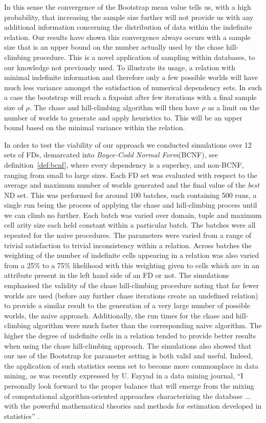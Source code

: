 In this sense the convergence of the Bootstrap mean value
tells us, with a high probability, that
increasing the sample size further will not provide us with any
additional information concerning the distribution of data within the
indefinite relation. Our 
results have shown this convergence always occurs with a sample size 
that is an upper bound on the 
number actually used by the chase hill-climbing procedure. This is a novel
application of sampling within databases, to our knowledge not
previously used. To illustrate its usage, a relation with 
minimal indefinite information and therefore only
a few possible worlds will have much less variance amongst the satisfaction
of numerical dependency sets. In such a case the bootstrap will reach
a fixpoint after few iterations with a final sample size of $\rho$. The
chase and hill-climbing algorithm will then have $\rho$ as a limit on
the number of worlds to generate and apply heuristics to. This will be
an upper bound based on the minimal variance within the relation.

\smallskip

In order to test the viability of our approach we conducted simulations
over 12 sets of FDs, demarcated into {\em Boyce-Codd Normal
Form}(BCNF), see definition~\ref{def:bcnf}, where every dependency is
a superkey, 
and non-BCNF, ranging from small to large sizes. 
 Each FD set was evaluated with respect to the average and maximum number
of worlds generated and the final value of the {\em best} ND set.
This was performed for around 100 batches, each containing 500 runs, a
single run being the process of applying the 
chase and hill-climbing process until we can climb no further. 
Each batch was varied over domain, tuple
and maximum cell arity size each held constant within a
particular batch. The batches were all repeated for the naive procedures. The
parameters 
were varied from a range of trivial satisfaction to trivial inconsistency
within a relation. Across batches the weighting of the number of 
indefinite cells appearing in a relation was also varied from a 25\%
to a 75\% likelihood with this weighting given to cells which are
in an attribute present in the left hand side of an FD or not.
The simulations
emphasised the validity of the chase hill-climbing procedure noting that
far fewer worlds are used (before any further chase iterations create
an undefined relation) to provide a similar result to the generation of
a very large number of possible worlds, the naive
approach. Additionally, the run times for the chase and hill-climbing
algorithm were much faster than the corresponding naive algorithm. The higher
the degree of indefinite cells in a relation tended to provide better
results when using the chase hill-climbing approach.
 The simulations also showed that our
use of the Bootstrap for parameter setting is both valid and useful.
Indeed, the application of such statistics seems set to become more
commonplace in data mining, as was recently expressed by U. Fayyad in
a data mining journal, ``I personally look forward to the
proper balance that
will emerge from the mixing of computational algorithm-oriented
approaches characterizing the database ... with the powerful
mathematical theories and methods for estimation developed in statistics''
\cite{fay98}.


